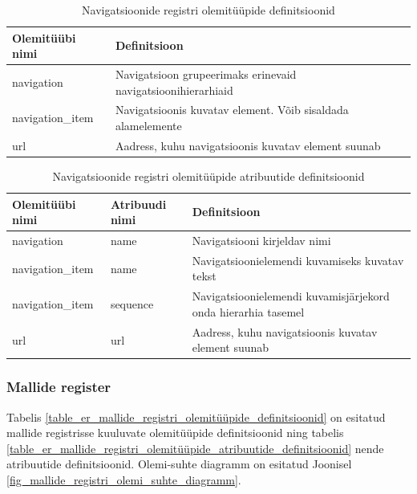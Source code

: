 \documentclass[a4paper,12pt]{article} %
\begin{document}
\begin{table}[H]
\centering
\caption{Navigatsioonide registri olemitüüpide definitsioonid}
\label{table_er_navigatsioonide_registri_olemitüüpide_definitsioonid}
\begin{tabular}{|p{4cm}|p{11cm}|}
\hline
\rowcolor{rowgray}
Olemitüübi nimi & Definitsioon \\ \hline
navigation & Navigatsioon grupeerimaks erinevaid navigatsioonihierarhiaid \\ \hline
navigation\_item & Navigatsioonis kuvatav element. Võib sisaldada alamelemente \\ \hline
url & Aadress, kuhu navigatsioonis kuvatav element suunab \\ \hline
\end{tabular}
\end{table}

\begin{table}[H]
\centering
\caption{Navigatsioonide registri olemitüüpide atribuutide definitsioonid}
\label{table_er_navigatsioonide_registri_olemitüüpide_atribuutide_definitsioonid}
\begin{tabular}{|p{4cm}|p{4cm}|p{7cm}|}
\hline
\rowcolor{rowgray}
Olemitüübi nimi & Atribuudi nimi & Definitsioon \\ \hline
navigation & name & Navigatsiooni kirjeldav nimi \\ \hline
navigation\_item & name & Navigatsioonielemendi kuvamiseks kuvatav tekst \\ \hline
navigation\_item & sequence & Navigatsioonielemendi kuvamisjärjekord onda hierarhia tasemel \\ \hline
url & url & Aadress, kuhu navigatsioonis kuvatav element suunab \\ \hline
\end{tabular}
\end{table}

\subsubsection{Mallide register}
Tabelis \ref{table_er_mallide_registri_olemitüüpide_definitsioonid} on esitatud mallide registrisse kuuluvate olemitüüpide definitsioonid ning tabelis \ref{table_er_mallide_registri_olemitüüpide_atribuutide_definitsioonid} nende atribuutide definitsioonid. Olemi-suhte diagramm on esitatud Joonisel \ref{fig_mallide_registri_olemi_suhte_diagramm}.
\end{document}

